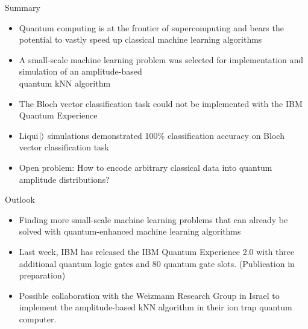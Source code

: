 \documentclass[10pt]{beamer}
\begin{document}
\begin{frame}{Summary}
\begin{itemize}
\item Quantum computing is at the frontier of supercomputing and bears the potential to vastly speed up classical machine learning algorithms
\item A small-scale machine learning problem was selected for implementation and simulation of an amplitude-based\\quantum kNN algorithm
\item The Bloch vector classification task could not be implemented with the IBM Quantum Experience
\item Liqui$\ket{}$ simulations demonstrated 100\% classification accuracy on Bloch vector classification task
\item Open problem: How to encode arbitrary classical data into quantum amplitude distributions?
\end{itemize}
\end{frame}

\begin{frame}{Outlook}

\begin{itemize}
\item Finding more small-scale machine learning problems that can already be solved with quantum-enhanced machine learning algorithms
\item Last week, IBM has released the IBM Quantum Experience 2.0 with three additional quantum logic gates and 80 quantum gate slots. (Publication in preparation)
\item Possible collaboration with the Weizmann Research Group in Israel to implement the amplitude-based kNN algorithm in their ion trap quantum computer.
\end{itemize}
\end{frame}
\end{document}

